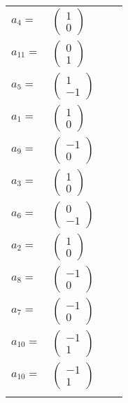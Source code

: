 \documentclass[1p]{elsarticle_modified}
\theoremstyle{definition}
\begin{document}
\begin{tabular}{m{7pt} m{180pt} m{7pt} m{180pt} }
\flushright $a_{4}=$&$\begin{pmatrix}1\\0\end{pmatrix}$ \\
\flushright $a_{11}=$&$\begin{pmatrix}0\\1\end{pmatrix}$ \\
\flushright $a_{5}=$&$\begin{pmatrix}1\\-1\end{pmatrix}$ \\
\flushright $a_{1}=$&$\begin{pmatrix}1\\0\end{pmatrix}$ \\
\flushright $a_{9}=$&$\begin{pmatrix}-1\\0\end{pmatrix}$ \\
\flushright $a_{3}=$&$\begin{pmatrix}1\\0\end{pmatrix}$ \\
\flushright $a_{6}=$&$\begin{pmatrix}0\\-1\end{pmatrix}$ \\
\flushright $a_{2}=$&$\begin{pmatrix}1\\0\end{pmatrix}$ \\
\flushright $a_{8}=$&$\begin{pmatrix}-1\\0\end{pmatrix}$ \\
\flushright $a_{7}=$&$\begin{pmatrix}-1\\0\end{pmatrix}$ \\
\flushright $a_{10}=$&$\begin{pmatrix}-1\\1\end{pmatrix}$\\ \flushright $a_{10}=$&$\begin{pmatrix}-1\\1\end{pmatrix}$\\&\end{tabular}
\end{document}
